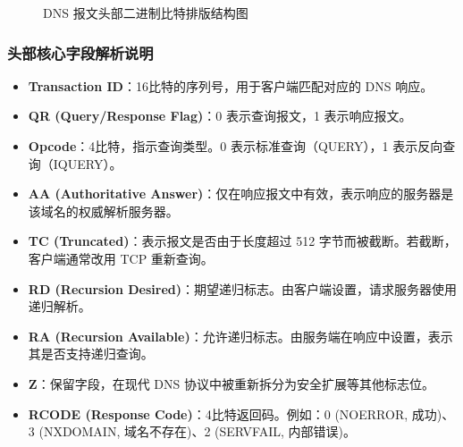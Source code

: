 \documentclass[11pt,a4paper]{ctexart}
\begin{document}
\begin{figure}[H]
    \caption{DNS 报文头部二进制比特排版结构图}
    \label{fig:dns_header}
\end{figure}

\subsubsection{头部核心字段解析说明}
\begin{itemize}
    \item \textbf{Transaction ID}：16比特的序列号，用于客户端匹配对应的 DNS 响应。
    \item \textbf{QR (Query/Response Flag)}：0 表示查询报文，1 表示响应报文。
    \item \textbf{Opcode}：4比特，指示查询类型。0 表示标准查询（QUERY），1 表示反向查询（IQUERY）。
    \item \textbf{AA (Authoritative Answer)}：仅在响应报文中有效，表示响应的服务器是该域名的权威解析服务器。
    \item \textbf{TC (Truncated)}：表示报文是否由于长度超过 512 字节而被截断。若截断，客户端通常改用 TCP 重新查询。
    \item \textbf{RD (Recursion Desired)}：期望递归标志。由客户端设置，请求服务器使用递归解析。
    \item \textbf{RA (Recursion Available)}：允许递归标志。由服务端在响应中设置，表示其是否支持递归查询。
    \item \textbf{Z}：保留字段，在现代 DNS 协议中被重新拆分为安全扩展等其他标志位。
    \item \textbf{RCODE (Response Code)}：4比特返回码。例如：0 (NOERROR, 成功)、3 (NXDOMAIN, 域名不存在)、2 (SERVFAIL, 内部错误)。
\end{itemize}
\end{document}
